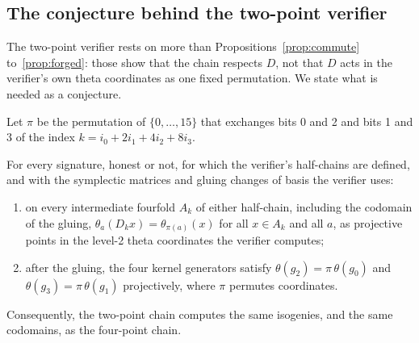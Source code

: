 {\color{red}
    \subsection{The conjecture behind the two-point verifier}
    \label{app:conjecture}

    The two-point verifier rests on more than
    Propositions~\ref{prop:commute} to~\ref{prop:forged}: those show that the
    chain respects $D$, not that $D$ acts in the verifier's own theta
    coordinates as one fixed permutation. We state what is needed as a
    conjecture.

    Let $\pi$ be the permutation of $\{0, \ldots, 15\}$ that exchanges bits 0
    and 2 and bits 1 and 3 of the index $k = i_0 + 2 i_1 + 4 i_2 + 8 i_3$.

    \begin{conjecture}
        \label{conj:twopoint}
        For every signature, honest or not, for which the verifier's half-chains
        are defined, and with the symplectic matrices and gluing changes of basis
        the verifier uses:
        \begin{enumerate}[label=(\roman*)]
            \item on every intermediate fourfold $A_k$ of either half-chain,
            including the codomain of the gluing, $\theta_a(D_k x) =
            \theta_{\pi(a)}(x)$ for all $x \in A_k$ and all $a$, as projective
            points in the level-2 theta coordinates the verifier computes;
            \item after the gluing, the four kernel generators satisfy
            $\theta(g_2) = \pi\,\theta(g_0)$ and $\theta(g_3) = \pi\,\theta(g_1)$
            projectively, where $\pi$ permutes coordinates.
        \end{enumerate}
        Consequently, the two-point chain computes the same isogenies, and the
        same codomains, as the four-point chain.
    \end{conjecture}

}
